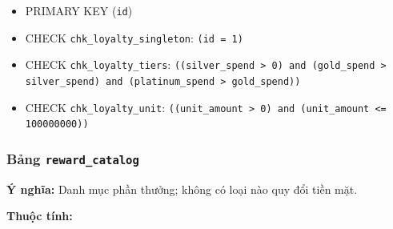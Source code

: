 \begin{itemize}

\item PRIMARY KEY (\texttt{id})

\item CHECK \texttt{chk\_loyalty\_singleton}: \texttt{(id = 1)}

\item CHECK \texttt{chk\_loyalty\_tiers}: \texttt{((silver\_spend > 0) and (gold\_spend > silver\_spend) and (platinum\_spend > gold\_spend))}

\item CHECK \texttt{chk\_loyalty\_unit}: \texttt{((unit\_amount > 0) and (unit\_amount <= 100000000))}

\end{itemize}

\subsubsection{Bảng \texttt{reward\_catalog}}

\textbf{Ý nghĩa:} Danh mục phần thưởng; không có loại nào quy đổi tiền mặt.\par

\textbf{Thuộc tính:}

